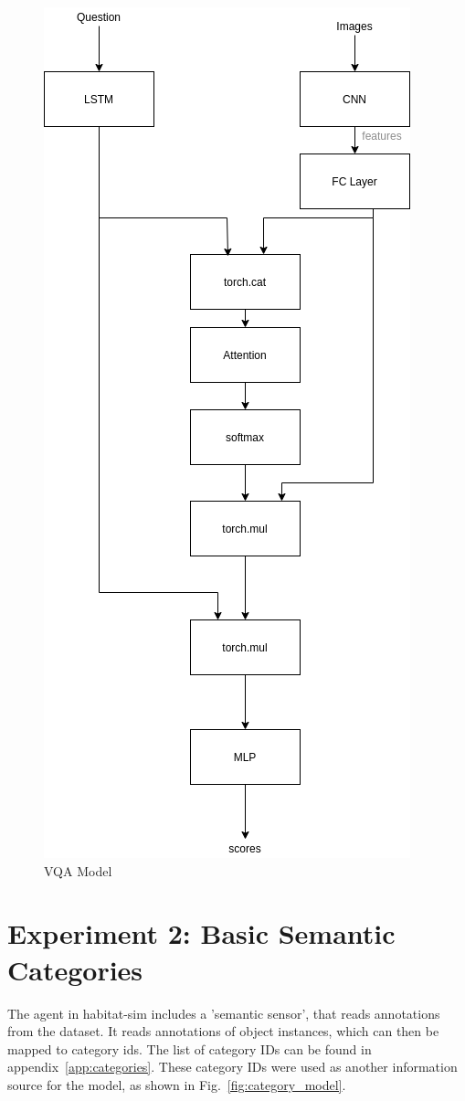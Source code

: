 \begin{figure}[h]
     \centering
     \includegraphics[width=.5\textwidth]{./figure/baseline_diagram.png}
     \caption{VQA Model}
     \label{fig:baseline_model}
\end{figure}

\section{Experiment 2: Basic Semantic Categories}
\label{sec:exp_2}
The agent in habitat-sim includes a 'semantic sensor', that reads annotations from the dataset. It reads annotations of object instances, which can then be mapped to category ids. The list of category IDs can be found in appendix~\ref{app:categories}. These category IDs were used as another information source for the model, as shown in Fig.~\ref{fig:category_model}.


